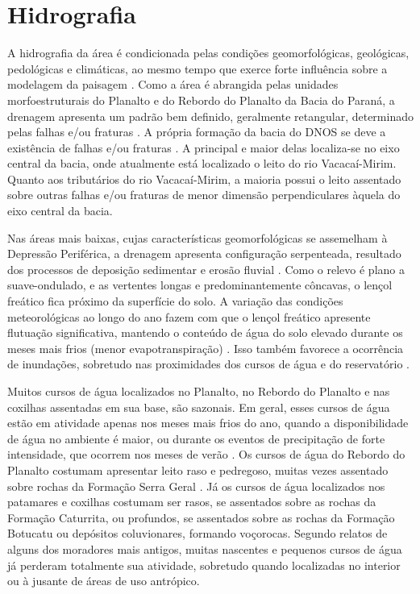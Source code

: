 \section{Hidrografia}
\label{sec:chap02-hidrografia}

A hidrografia da área é condicionada pelas condições geomorfológicas, geológicas, pedológicas e climáticas, ao 
mesmo tempo que exerce forte influência sobre a modelagem da paisagem \cite{NascimentoEtAl2010}. Como a área é 
abrangida pelas unidades morfoestruturais do Planalto e do Rebordo do Planalto da Bacia do Paraná, a drenagem 
apresenta um padrão bem definido, geralmente retangular, determinado pelas falhas e/ou fraturas 
\cite{Bortoluzzi1974, GasparettoEtAl1988, NascimentoEtAl2010}. A própria formação da bacia do DNOS se deve 
a existência de falhas e/ou fraturas \cite{GasparettoEtAl1988}. A principal e maior delas localiza-se no eixo 
central da bacia, onde atualmente está localizado o leito do rio Vacacaí-Mirim. Quanto aos tributários do rio 
Vacacaí-Mirim, a maioria possui o leito assentado sobre outras falhas e/ou fraturas de menor dimensão 
perpendiculares àquela do eixo central da bacia.

Nas áreas mais baixas, cujas características geomorfológicas se assemelham à Depressão Periférica, a drenagem 
apresenta configuração serpenteada, resultado dos processos de deposição sedimentar e erosão fluvial 
\cite{PaivaEtAl2001, SutiliEtAl2009}. Como o relevo é plano a suave-ondulado, e as vertentes longas e 
predominantemente côncavas, o lençol freático fica próximo da superfície do solo. A variação das condições 
meteorológicas ao longo do ano fazem com que o lençol freático apresente flutuação significativa, mantendo o 
conteúdo de água do solo elevado durante os meses mais frios (menor evapotranspiração) \cite{HeldweinEtAl2009}.
Isso também favorece a ocorrência de inundações, sobretudo nas proximidades dos cursos de água e do 
reservatório \cite{Goldani2006}.

Muitos cursos de água localizados no Planalto, no Rebordo do Planalto e nas coxilhas assentadas em sua base, 
são sazonais. Em geral, esses cursos de água estão em atividade apenas nos meses mais frios do ano, quando a 
disponibilidade de água no ambiente é maior, ou durante os eventos de precipitação de forte intensidade, que 
ocorrem nos meses de verão \cite{HeldweinEtAl2009, MouraBueno2012}. Os cursos de água do Rebordo do Planalto 
costumam apresentar leito raso e pedregoso, muitas vezes assentado sobre rochas da Formação Serra Geral 
\cite{SutiliEtAl2009}. Já os cursos de água localizados nos patamares e coxilhas costumam ser rasos, se 
assentados sobre as rochas da Formação Caturrita, ou profundos, se assentados sobre as rochas da Formação 
Botucatu ou depósitos coluvionares, formando voçorocas. Segundo relatos de alguns dos moradores mais antigos, 
muitas nascentes e pequenos cursos de água já perderam totalmente sua atividade, sobretudo quando localizadas 
no interior ou à jusante de áreas de uso antrópico.

